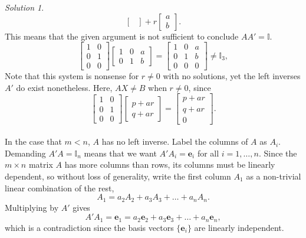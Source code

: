 \documentclass[11pt]{report}
\renewcommand\vec\boldsymbol
\def\ve{\vec{e}}
\theoremstyle{remark}
\newtheorem*{solution}{Solution}
\begin{document}
\begin{solution}
\[\begin{bmatrix}
            \end{bmatrix} + r \begin{bmatrix}
                a \\ b
            \end{bmatrix}.
        \] 
        This means that the given argument is not
        sufficient to conclude $A A' = \mathbb{I}$. \[
            \begin{bmatrix}
                1 & 0 \\ 0 & 1 \\ 0 & 0
            \end{bmatrix} \begin{bmatrix}
                1 & 0 & a \\ 0 & 1 & b
            \end{bmatrix} = \begin{bmatrix}
                1 & 0 & a\\ 0 & 1 & b \\ 0 & 0 & 0
            \end{bmatrix} \neq \mathbb{I}_3,
        \] Note that this system is nonsense for $r \neq 0$ with no solutions, yet
        the left inverses $A'$ do exist nonetheless. Here, $AX \neq B$ when $r \neq
        0$, since \[
            \begin{bmatrix}
                1 & 0 \\ 0 & 1 \\ 0 & 0
            \end{bmatrix} \begin{bmatrix}
                p + ar \\ q + ar
            \end{bmatrix} = \begin{bmatrix}
                 p + ar \\ q + ar \\ 0
            \end{bmatrix}.
        \] \\

        In the case that $m < n$, $A$ has no left inverse. Label the columns of $A$
        as $A_i$. Demanding $A'A = \mathbb{I}_n$ means that we want $A' A_i =
        \ve_{i}$ for all $i = 1, \dots, n$. Since the $m \times n$ matrix $A$ has
        more columns than rows, its columns must be linearly dependent, so without
        loss of generality, write the first column $A_1$ as a non-trivial linear
        combination of the rest, \[
            A_1 = a_2 A_2 + a_3A_3 + \dots + a_nA_n.
        \] Multiplying by $A'$ gives \[
            A'A_1 = \ve_1 = a_2\ve_2 + a_3\ve_3 + \dots + a_n\ve_n,
        \] which is a contradiction since the basis vectors $\{\ve_i\}$ are linearly
        independent. \\


\end{solution}
\end{document}
